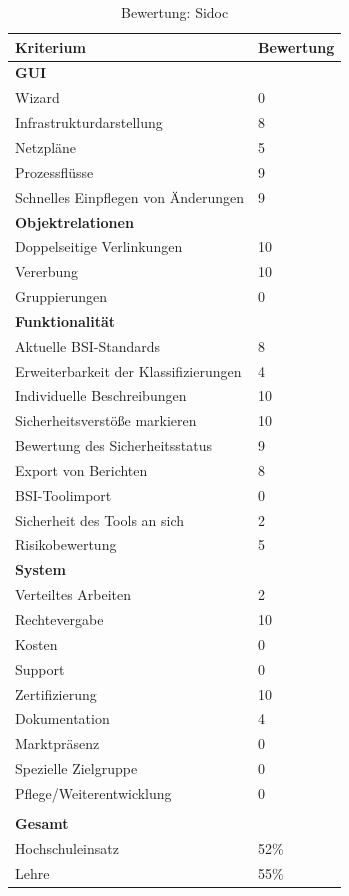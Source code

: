 \begin{table}[!htb]
\begin{tabular}{|p{}|p{}|}
\hline 
Kriterium & Bewertung\\ 
\hline 
\textbf{GUI}& \\
\hline
Wizard & 0\\
\hline 
Infrastrukturdarstellung & 8 \\
\hline 
Netzpläne & 5 \\
\hline 
Prozessflüsse & 9 \\
\hline 
Schnelles Einpflegen von Änderungen & 9 \\
\hline
\textbf{Objektrelationen} & \\
\hline 
Doppelseitige Verlinkungen & 10 \\
\hline 
Vererbung & 10 \\
\hline 
Gruppierungen & 0 \\
\hline 
\textbf{Funktionalität} &\\
\hline 
Aktuelle BSI-Standards & 8 \\
\hline  
Erweiterbarkeit der Klassifizierungen & 4 \\
\hline 
Individuelle Beschreibungen & 10 \\
\hline 
Sicherheitsverstöße markieren & 10 \\
\hline
Bewertung des Sicherheitsstatus & 9 \\
\hline
Export von Berichten & 8 \\
\hline
BSI-Toolimport & 0 \\
\hline
Sicherheit des Tools an sich & 2 \\
\hline
Risikobewertung & 5 \\
\hline
\textbf{System}&  \\
\hline
Verteiltes Arbeiten & 2 \\
\hline
Rechtevergabe & 10 \\
\hline
Kosten & 0 \\
\hline
Support & 0 \\
\hline
Zertifizierung & 10 \\
\hline
Dokumentation & 4 \\
\hline
Marktpräsenz & 0 \\
\hline
Spezielle Zielgruppe & 0 \\
\hline
Pflege/Weiterentwicklung & 0 \\
\hline
\multicolumn{2}{c}{}\\
\hline
\textbf{Gesamt} & \\
\hline
Hochschuleinsatz & 52\%\\
\hline
Lehre & 55\%\\
\hline
\end{tabular} 
\caption{Bewertung: Sidoc}
\label{tab:BewertungSidoc}
\end{table}
